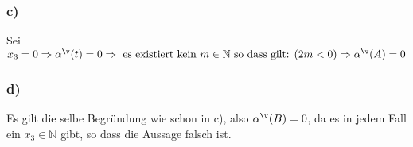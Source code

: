 \documentclass[11pt]{amsart}
\begin{document}
\subsubsection*{c)}
Sei \( x_3 = 0 \Rightarrow \alpha^{\v}(t) = 0 \Rightarrow\mbox{ es existiert kein } m \in \mathbb{N} 
\mbox{ so dass gilt: } (2m < 0) \Rightarrow \alpha^{\v}(A) = 0  \)

\subsubsection*{d)}
Es gilt die selbe Begründung wie schon in c), also $\alpha^{\v}(B) = 0$, da es in jedem Fall
ein $x_3 \in \mathbb{N}$ gibt, so dass die Aussage falsch ist.
\end{document}
